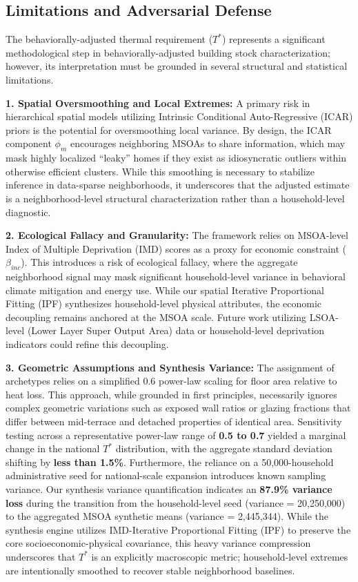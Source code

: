 \documentclass[11pt, a4paper, twocolumn]{article}
\begin{document}
\subsection{Limitations and Adversarial
Defense}\label{limitations-and-adversarial-defense}

The behaviorally-adjusted thermal requirement (\(T^*\)) represents a significant 
methodological step in behaviorally-adjusted building stock 
characterization; however, its interpretation must be grounded in 
several structural and statistical limitations.

\textbf{1. Spatial Oversmoothing and Local Extremes:} A primary risk in
hierarchical spatial models utilizing Intrinsic Conditional
Auto-Regressive (ICAR) priors is the potential for oversmoothing local
variance. By design, the ICAR component \(\phi_m\) encourages
neighboring MSOAs to share information, which may mask highly localized
``leaky'' homes if they exist as idiosyncratic outliers within otherwise
efficient clusters. While this smoothing is necessary to stabilize
inference in data-sparse neighborhoods, it underscores that the adjusted estimate is a 
neighborhood-level structural characterization rather than a 
household-level diagnostic.

\textbf{2. Ecological Fallacy and Granularity:} The framework relies on
MSOA-level Index of Multiple Deprivation (IMD) scores as a proxy for
economic constraint (\(\beta_{inc}\)). This introduces a risk of
ecological fallacy, where the aggregate neighborhood signal may mask
significant household-level variance in behavioral climate mitigation
and energy use. While our spatial Iterative Proportional Fitting (IPF) synthesizes
household-level physical attributes, the economic decoupling remains
anchored at the MSOA scale. Future work utilizing LSOA-level (Lower
Layer Super Output Area) data or household-level deprivation indicators
could refine this decoupling.

\textbf{3. Geometric Assumptions and Synthesis Variance:} The assignment
of archetypes relies on a simplified \(0.6\) power-law scaling for floor
area relative to heat loss. This approach, while grounded in first
principles, necessarily ignores complex geometric variations such as
exposed wall ratios or glazing fractions that differ between mid-terrace
and detached properties of identical area. Sensitivity testing across a 
representative power-law range of \textbf{0.5 to 0.7} yielded a marginal 
change in the national $T^*$ distribution, with the aggregate standard 
deviation shifting by \textbf{less than 1.5\%}. Furthermore, the reliance on
a 50,000-household administrative seed for national-scale expansion
introduces known sampling variance. Our synthesis variance quantification indicates an \textbf{87.9\% variance loss} during the transition from the household-level seed (variance = 20,250,000) to the aggregated MSOA synthetic means (variance = 2,445,344). While the synthesis engine utilizes IMD-Iterative Proportional Fitting (IPF) to preserve the core socioeconomic-physical covariance, this heavy variance compression underscores that $T^*$ is an explicitly macroscopic metric; household-level extremes are intentionally smoothed to recover stable neighborhood baselines.
\end{document}
